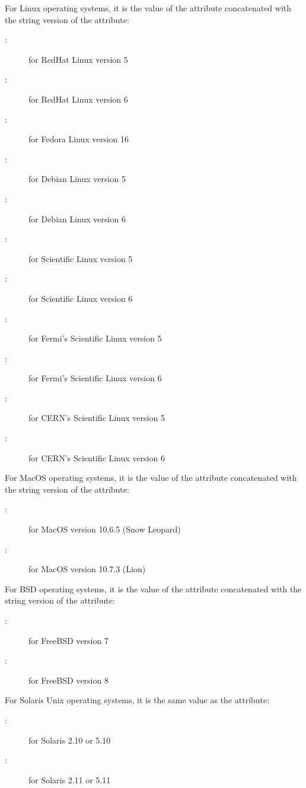\begin{description}
For Linux operating systems, it is the value of the  attribute 
concatenated with the string version of the  attribute:
	\begin{description}
	\item[:] for RedHat Linux version 5
	\item[:] for RedHat Linux version 6
	\item[:] for Fedora Linux version 16
	\item[:] for Debian Linux version 5
	\item[:] for Debian Linux version 6
	\item[:] for Scientific Linux version 5
	\item[:] for Scientific Linux version 6
	\item[:] for Fermi's Scientific Linux version 5
	\item[:] for Fermi's Scientific Linux version 6
	\item[:] for CERN's Scientific Linux version 5
	\item[:] for CERN's Scientific Linux version 6
	\end{description}
For MacOS operating systems, it is the value of the  
attribute concatenated with the string version of the  attribute: 
	\begin{description}
	\item[:] for MacOS version 10.6.5 (Snow Leopard)
	\item[:] for MacOS version 10.7.3 (Lion)
	\end{description}
For BSD operating systems, it is the value of the  attribute 
concatenated with the string version of the  attribute:
	\begin{description}
	\item[:] for FreeBSD version 7
	\item[:] for FreeBSD version 8
	\end{description}
For Solaris Unix operating systems, 
it is the same value as the  attribute: 
	\begin{description}
	\item[:] for Solaris 2.10 or 5.10
	\item[:] for Solaris 2.11 or 5.11

\end{description}
\end{description}
